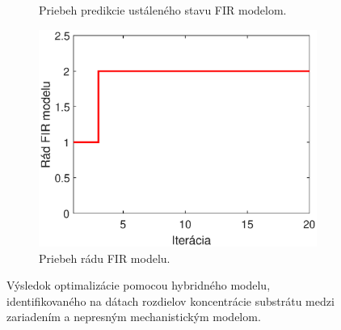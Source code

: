 \begin{figure}
\begin{subfigure}[b]{0.49\textwidth}
		\caption{Priebeh predikcie ustáleného stavu FIR modelom. \newline}
		\label{fig:hybrid_sub_ss}
	\end{subfigure}
	\bigskip
	\begin{subfigure}[b]{0.49\textwidth}
		\centering
		\includegraphics[width=\linewidth]{images/hybrid_sub_order}
		\caption{Priebeh rádu FIR modelu.}
		\label{fig:hybrid_sub_order}
	\end{subfigure}
	\caption{Výsledok optimalizácie pomocou hybridného modelu, identifikovaného na dátach rozdielov koncentrácie substrátu medzi zariadením a nepresným mechanistickým modelom.}
	\label{fig:hybrid_sub_opt_results}	
\end{figure}

